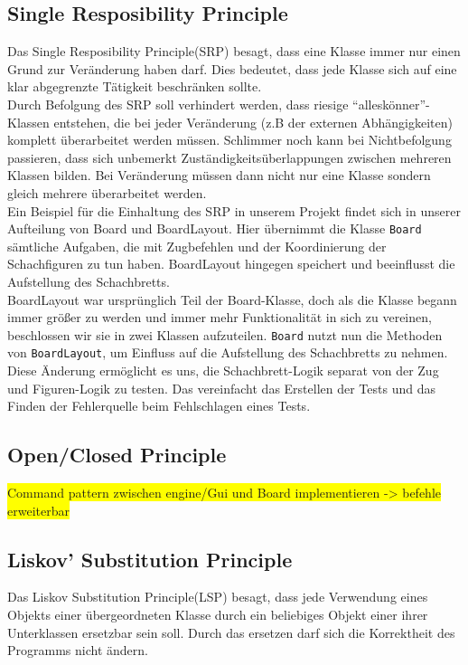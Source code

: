 \documentclass[
10pt, %
a4paper, %
oneside, %
headinclude,footinclude, %
BCOR5mm, %
]{scrartcl}
\begin{document}
\begin{onehalfspace}
\subsection{Single Resposibility Principle}
Das Single Resposibility Principle(SRP) besagt, dass eine Klasse immer nur einen Grund zur Veränderung haben darf. Dies bedeutet, dass jede Klasse sich auf eine klar abgegrenzte Tätigkeit beschränken sollte. 
\\
Durch Befolgung des SRP soll verhindert werden, dass riesige \enquote{alleskönner}-Klassen entstehen, die bei jeder Veränderung (z.B der externen Abhängigkeiten) komplett überarbeitet werden müssen. Schlimmer noch kann bei Nichtbefolgung passieren, dass sich unbemerkt Zuständigkeitsüberlappungen zwischen mehreren Klassen bilden. Bei Veränderung müssen dann nicht nur eine Klasse sondern gleich mehrere überarbeitet werden.
\\
Ein Beispiel für die Einhaltung des SRP in unserem Projekt findet sich in unserer Aufteilung von Board und BoardLayout. Hier übernimmt die Klasse \texttt{Board} sämtliche Aufgaben, die mit Zugbefehlen und der Koordinierung der Schachfiguren zu tun haben. BoardLayout hingegen speichert und beeinflusst die Aufstellung des Schachbretts.
\\
BoardLayout war ursprünglich Teil der Board-Klasse, doch als die Klasse begann immer größer zu werden und immer mehr Funktionalität in sich zu vereinen, beschlossen wir sie in zwei Klassen aufzuteilen.
\texttt{Board} nutzt nun die Methoden von \texttt{BoardLayout}, um Einfluss auf die Aufstellung des Schachbretts zu nehmen.
\\
Diese Änderung ermöglicht es uns, die Schachbrett-Logik separat von der Zug und Figuren-Logik zu testen. Das vereinfacht das Erstellen der Tests und das Finden der Fehlerquelle beim Fehlschlagen eines Tests.
\subsection{Open/Closed Principle}
\colorbox{yellow}{Command pattern zwischen engine/Gui und Board implementieren -> befehle erweiterbar}
\subsection{Liskov' Substitution Principle}
Das Liskov Substitution Principle(LSP) besagt, dass jede Verwendung eines Objekts einer übergeordneten Klasse durch ein beliebiges Objekt einer ihrer Unterklassen ersetzbar sein soll. Durch das ersetzen darf sich die Korrektheit des Programms nicht ändern.


\end{onehalfspace}
\end{document}

